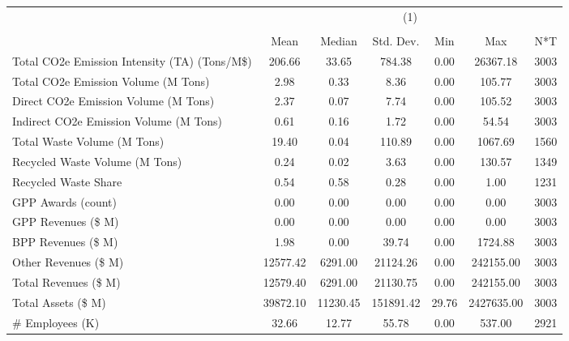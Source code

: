 {
\def\sym#1{\ifmmode^{#1}\else\(^{#1}\)\fi}
\begin{tabular}{l*{1}{cccccc}}
\hline\hline
                    &\multicolumn{6}{c}{(1)}                                                      \\
                    &\multicolumn{6}{c}{}                                                         \\
                    &        Mean&      Median&   Std. Dev.&         Min&         Max&         N*T\\
\hline
Total CO2e Emission Intensity (TA) (Tons/M\$)&      206.66&       33.65&      784.38&        0.00&    26367.18&        3003\\
Total CO2e Emission Volume (M Tons)&        2.98&        0.33&        8.36&        0.00&      105.77&        3003\\
Direct CO2e Emission Volume (M Tons)&        2.37&        0.07&        7.74&        0.00&      105.52&        3003\\
Indirect CO2e Emission Volume (M Tons)&        0.61&        0.16&        1.72&        0.00&       54.54&        3003\\
Total Waste Volume (M Tons)&       19.40&        0.04&      110.89&        0.00&     1067.69&        1560\\
Recycled Waste Volume (M Tons)&        0.24&        0.02&        3.63&        0.00&      130.57&        1349\\
Recycled Waste Share&        0.54&        0.58&        0.28&        0.00&        1.00&        1231\\
GPP Awards (count)  &        0.00&        0.00&        0.00&        0.00&        0.00&        3003\\
GPP Revenues (\$ M) &        0.00&        0.00&        0.00&        0.00&        0.00&        3003\\
BPP Revenues (\$ M) &        1.98&        0.00&       39.74&        0.00&     1724.88&        3003\\
Other Revenues (\$ M)&    12577.42&     6291.00&    21124.26&        0.00&   242155.00&        3003\\
Total Revenues (\$ M)&    12579.40&     6291.00&    21130.75&        0.00&   242155.00&        3003\\
Total Assets (\$ M) &    39872.10&    11230.45&   151891.42&       29.76&  2427635.00&        3003\\
\# Employees (K)    &       32.66&       12.77&       55.78&        0.00&      537.00&        2921\\

\end{tabular}}
